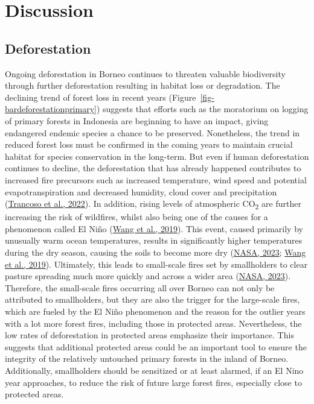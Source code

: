 \documentclass[
  letterpaper,
  DIV=11,
  numbers=noendperiod]{scrreprt}
\begin{document}

\hypertarget{sec-discussion}{%
\chapter{Discussion}\label{sec-discussion}}

\hypertarget{sec-d_deforestation}{%
\section{Deforestation}\label{sec-d_deforestation}}

Ongoing deforestation in Borneo continues to threaten valuable
biodiversity through further deforestation resulting in habitat loss or
degradation. The declining trend of forest loss in recent years
(Figure~\ref{fig-bardeforestationprimary}) suggests that efforts such as
the moratorium on logging of primary forests in Indonesia are beginning
to have an impact, giving endangered endemic species a chance to be
preserved. Nonetheless, the trend in reduced forest loss must be
confirmed in the coming years to maintain crucial habitat for species
conservation in the long-term. But even if human deforestation continues
to decline, the deforestation that has already happened contributes to
increased fire precursors such as increased temperature, wind speed and
potential evapotranspiration and decreased humidity, cloud cover and
precipitation
(\protect\hyperlink{ref-trancosoConvertingTropicalForests2022}{Trancoso
et al., 2022}). In addition, rising levels of atmospheric
CO\textsubscript{2} are further increasing the risk of wildfires, whilst
also being one of the causes for a phenomenon called El Niño
(\protect\hyperlink{ref-wangHistoricalChangeNino2019}{Wang et al.,
2019}). This event, caused primarily by unusually warm ocean
temperatures, results in significantly higher temperatures during the
dry season, causing the soils to become more dry
(\protect\hyperlink{ref-nasaIndonesianFiresReturn2023}{NASA, 2023};
\protect\hyperlink{ref-wangHistoricalChangeNino2019}{Wang et al.,
2019}). Ultimately, this leads to small-scale fires set by smallholders
to clear pasture spreading much more quickly and across a wider area
(\protect\hyperlink{ref-nasaIndonesianFiresReturn2023}{NASA, 2023}).
Therefore, the small-scale fires occurring all over Borneo can not only
be attributed to smallholders, but they are also the trigger for the
large-scale fires, which are fueled by the El Niño phenomenon and the
reason for the outlier years with a lot more forest fires, including
those in protected areas. Nevertheless, the low rates of deforestation
in protected areas emphasize their importance. This suggests that
additional protected areas could be an important tool to ensure the
integrity of the relatively untouched primary forests in the inland of
Borneo. Additionally, smallholders should be sensitized or at least
alarmed, if an El Nino year approaches, to reduce the risk of future
large forest fires, especially close to protected areas.
\end{document}
